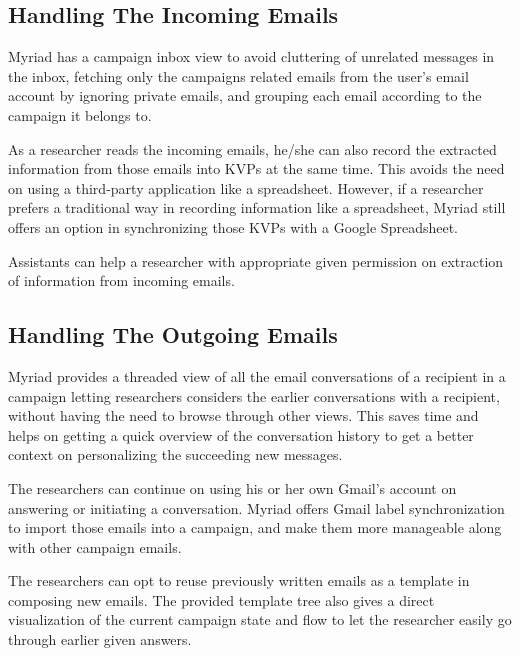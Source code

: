 \subsection{Handling The Incoming Emails}
\label{subsec:5.4.1:IncoEmai}

Myriad has a campaign inbox view to avoid cluttering of unrelated messages  in the inbox, fetching only the campaigns related emails from the user's email account by ignoring private emails, and grouping each email according to the campaign it belongs to.
\vspace{1cm}

As a researcher reads the incoming emails, he/she can also record the extracted information from those emails into \ac{KVP}s at the same time. This avoids the need on using a third-party application like a spreadsheet. However, if a researcher prefers a traditional way in recording information like a spreadsheet, Myriad still offers an option in synchronizing those \ac{KVP}s with a Google Spreadsheet.
\vspace{1cm}

Assistants can help a researcher with appropriate given permission on extraction of information from incoming emails.


\subsection{Handling The Outgoing Emails}
\label{subsec:5.4.2:IncoEmai}

Myriad provides a threaded view of all the email conversations of a recipient in a campaign letting researchers considers the earlier conversations with a recipient, without having the need to browse through other views. This saves time and helps on getting a quick overview of the conversation history to get a better context on personalizing the succeeding new messages.
\vspace{1cm}

The researchers can continue on using his or her own Gmail's account on answering or initiating a conversation. Myriad offers Gmail label synchronization to import those emails into a campaign, and make them more manageable along with other campaign emails.
\vspace{1cm}

The researchers can opt to reuse previously written emails as a template in composing new emails. The provided template tree also gives a direct visualization of the current campaign state and flow to let the researcher easily go through earlier given answers.
\vspace{1cm}

